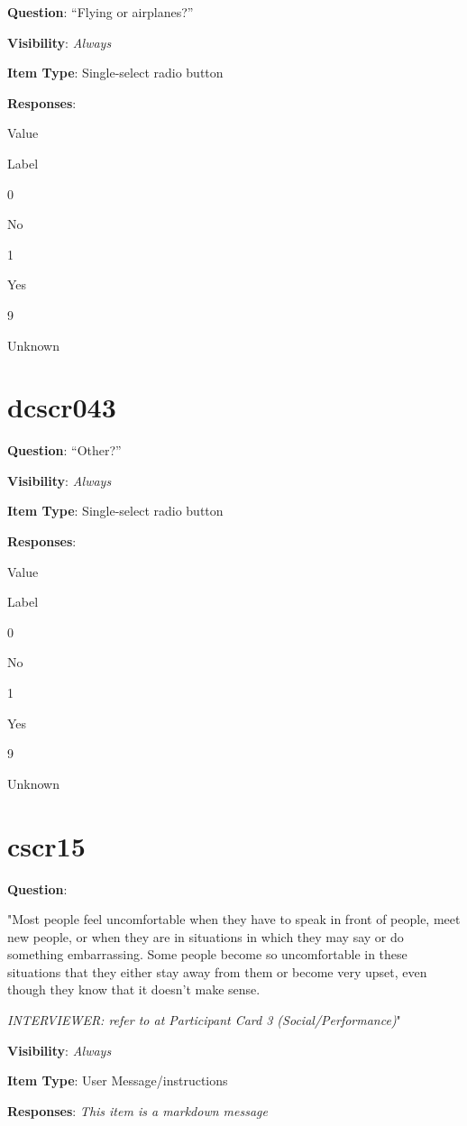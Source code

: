 \documentclass[]{book}
\begin{document}
\textbf{Question}: ``Flying or airplanes?''

\textbf{Visibility}: \emph{Always}

\textbf{Item Type}: Single-select radio button

\textbf{Responses}:

Value

Label

0

No

1

Yes

9

Unknown

\hypertarget{dcscr043}{%
\section{dcscr043}\label{dcscr043}}

\textbf{Question}: ``Other?''

\textbf{Visibility}: \emph{Always}

\textbf{Item Type}: Single-select radio button

\textbf{Responses}:

Value

Label

0

No

1

Yes

9

Unknown

\hypertarget{cscr15}{%
\section{cscr15}\label{cscr15}}

\textbf{Question}:

"Most people feel uncomfortable when they have to speak in front of people, meet new people, or when they are in situations in which they may say or do something embarrassing. Some people become so uncomfortable in these situations that they either stay away from them or become very upset, even though they know that it doesn't make sense.

\emph{INTERVIEWER: refer to at Participant Card 3 (Social/Performance)}"

\textbf{Visibility}: \emph{Always}

\textbf{Item Type}: User Message/instructions

\textbf{Responses}: \emph{This item is a markdown message}
\end{document}
